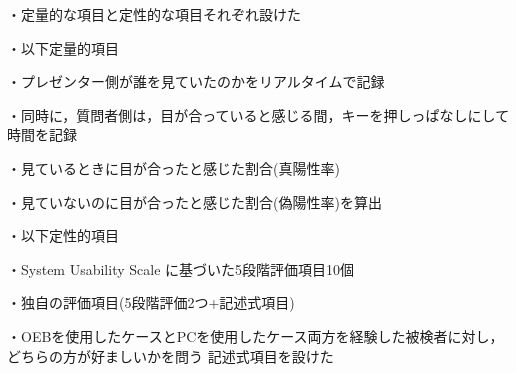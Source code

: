 ・定量的な項目と定性的な項目それぞれ設けた

・以下定量的項目

・プレゼンター側が誰を見ていたのかをリアルタイムで記録

・同時に，質問者側は，目が合っていると感じる間，キーを押しっぱなしにして時間を記録

・見ているときに目が合ったと感じた割合(真陽性率)

・見ていないのに目が合ったと感じた割合(偽陽性率)を算出

・以下定性的項目

・System Usability Scale に基づいた5段階評価項目10個

・独自の評価項目(5段階評価2つ+記述式項目)

・OEBを使用したケースとPCを使用したケース両方を経験した被検者に対し，どちらの方が好ましいかを問う
記述式項目を設けた